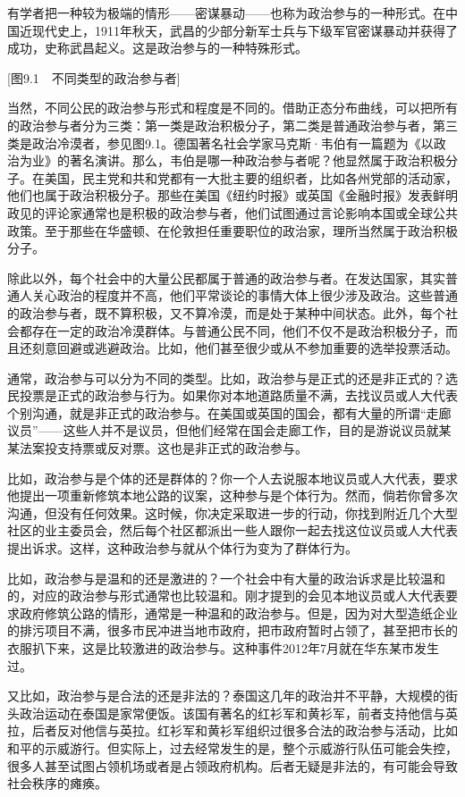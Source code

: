 {有学者把一种较为极端的情形——密谋暴动——也称为政治参与的一种形式。在中国近现代史上，1911年秋天，武昌的少部分新军士兵与下级军官密谋暴动并获得了成功，史称武昌起义。这是政治参与的一种特殊形式。

[图9.1　不同类型的政治参与者]

当然，不同公民的政治参与形式和程度是不同的。借助正态分布曲线，可以把所有的政治参与者分为三类：第一类是政治积极分子，第二类是普通政治参与者，第三类是政治冷漠者，参见图9.1。德国著名社会学家马克斯·韦伯有一篇题为《以政治为业》的著名演讲。那么，韦伯是哪一种政治参与者呢？他显然属于政治积极分子。在美国，民主党和共和党都有一大批主要的组织者，比如各州党部的活动家，他们也属于政治积极分子。那些在美国《纽约时报》或英国《金融时报》发表鲜明政见的评论家通常也是积极的政治参与者，他们试图通过言论影响本国或全球公共政策。至于那些在华盛顿、在伦敦担任重要职位的政治家，理所当然属于政治积极分子。

除此以外，每个社会中的大量公民都属于普通的政治参与者。在发达国家，其实普通人关心政治的程度并不高，他们平常谈论的事情大体上很少涉及政治。这些普通的政治参与者，既不算积极，又不算冷漠，而是处于某种中间状态。此外，每个社会都存在一定的政治冷漠群体。与普通公民不同，他们不仅不是政治积极分子，而且还刻意回避或逃避政治。比如，他们甚至很少或从不参加重要的选举投票活动。

通常，政治参与可以分为不同的类型。比如，政治参与是正式的还是非正式的？选民投票是正式的政治参与行为。如果你对本地道路质量不满，去找议员或人大代表个别沟通，就是非正式的政治参与。在美国或英国的国会，都有大量的所谓“走廊议员”——这些人并不是议员，但他们经常在国会走廊工作，目的是游说议员就某某法案投支持票或反对票。这也是非正式的政治参与。

比如，政治参与是个体的还是群体的？你一个人去说服本地议员或人大代表，要求他提出一项重新修筑本地公路的议案，这种参与是个体行为。然而，倘若你曾多次沟通，但没有任何效果。这时候，你决定采取进一步的行动，你找到附近几个大型社区的业主委员会，然后每个社区都派出一些人跟你一起去找这位议员或人大代表提出诉求。这样，这种政治参与就从个体行为变为了群体行为。

比如，政治参与是温和的还是激进的？一个社会中有大量的政治诉求是比较温和的，对应的政治参与形式通常也比较温和。刚才提到的会见本地议员或人大代表要求政府修筑公路的情形，通常是一种温和的政治参与。但是，因为对大型造纸企业的排污项目不满，很多市民冲进当地市政府，把市政府暂时占领了，甚至把市长的衣服扒下来，这是比较激进的政治参与。这种事件2012年7月就在华东某市发生过。

又比如，政治参与是合法的还是非法的？泰国这几年的政治并不平静，大规模的街头政治运动在泰国是家常便饭。该国有著名的红衫军和黄衫军，前者支持他信与英拉，后者反对他信与英拉。红衫军和黄衫军组织过很多合法的政治参与活动，比如和平的示威游行。但实际上，过去经常发生的是，整个示威游行队伍可能会失控，很多人甚至试图占领机场或者是占领政府机构。后者无疑是非法的，有可能会导致社会秩序的瘫痪。

}
